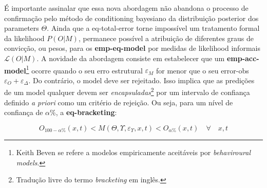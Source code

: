 \documentclass[./main.tex]{subfiles}
\begin{document}
\noindent É importante assinalar que essa nova abordagem não abandona o processo de confirmação pelo método de \gls{conditioning} bayesiano da distribuição posterior dos \gls{parameters} $\Theta$. Ainda que a \gls{eq-total-error} torne impossível um tratamento formal da \gls{likelihood} $P(O|M)$, permanece possível a atribuição de diferentes graus de convicção, ou pesos, para os \textbf{\gls{emp-eq-model}} por medidas de \gls{likelihood} informais $\mathcal{L}(O|M)$. A novidade da abordagem consiste em estabelecer que um \textbf{\gls{emp-acc-model}}\footnote{Keith Beven se refere a modelos empiricamente aceitáveis por \textit{behaviroural models}.} ocorre quando o seu erro estrutural $\varepsilon_M$ for menor que o seu \gls{error-obs} $\varepsilon_O + \varepsilon_{\Delta}$. Do contrário, o \gls{model} deve ser rejeitado. Isso implica que as predições de um \gls{model} qualquer devem ser \textit{encapsuladas}\footnote{Tradução livre do termo \textit{bracketing} em inglês.} por um intervalo de confiança definido \textit{a priori} como um critério de rejeição. Ou seja, para um nível de confiança de $\alpha$\%, a \textbf{\gls{eq-bracketing}}:
\begin{linenomath*}
\begin{equation}
\label{eq:bracketing}
    O_{100-\alpha\%}(x, t) < M(\Theta, \Upsilon, \varepsilon_{\Upsilon}, x, t) < O_{\alpha\%}(x, t) \quad \forall \quad x, t
\end{equation}
\end{linenomath*}
\end{document}
